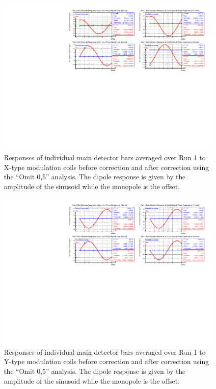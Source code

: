\begin{landscape}
\begin{figure}[!ht]
\begin{center}
\includegraphics[width=9in]{./Pictures/Run1_X_dipoleOmit05.pdf}
\caption{\label{fig:Run1_Omit05_Xdipoles}Responses of individual main detector bars averaged over Run 1 to X-type modulation coils before correction and after correction using the ``Omit 0,5'' analysis. The dipole response is given by the amplitude of the sinusoid while the monopole is the offset.}
\end{center}
\end{figure}
\begin{figure}[!ht]
\begin{center}
\includegraphics[width=9in]{./Pictures/Run1_Y_dipoleOmit05.pdf}
\caption{\label{fig:Run1_Omit05_Ydipoles}Responses of individual main detector bars averaged over Run 1 to Y-type modulation coils before correction and after correction using the ``Omit 0,5'' analysis. The dipole response is given by the amplitude of the sinusoid while the monopole is the offset.}
\end{center}
\end{figure}


\end{landscape}
